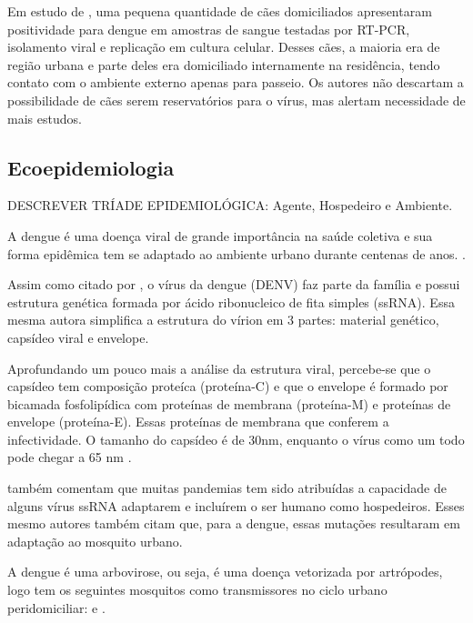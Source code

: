 \indent Em estudo de , uma pequena quantidade de cães domiciliados apresentaram positividade para dengue em amostras de sangue testadas por RT-PCR, isolamento viral e replicação em cultura celular. Desses cães, a maioria era de região urbana e parte deles era domiciliado internamente na residência, tendo contato com o ambiente externo apenas para passeio. Os autores não descartam a possibilidade de cães serem reservatórios para o vírus, mas alertam necessidade de mais estudos.

\subsection{Ecoepidemiologia}

\indent DESCREVER TRÍADE EPIDEMIOLÓGICA: Agente, Hospedeiro e Ambiente.


\indent A dengue é uma doença viral de grande importância na saúde coletiva e sua forma epidêmica tem se adaptado ao ambiente urbano durante centenas de anos. \cite{ArboviralTransmission}.

\indent Assim como citado por , o vírus da dengue (\acrfull{DENV}) faz parte da família  e possui estrutura genética formada por ácido ribonucleico de fita simples (\acrfull{ssRNA}). Essa mesma autora simplifica a estrutura do vírion em 3 partes: material genético, capsídeo viral e envelope.

\indent Aprofundando um pouco mais a análise da estrutura viral, percebe-se que o capsídeo tem composição proteíca (proteína-C) e que o envelope é formado por bicamada fosfolipídica com proteínas de membrana (proteína-M) e proteínas de envelope (proteína-E). Essas proteínas de membrana que conferem a infectividade. O tamanho do capsídeo é de 30nm, enquanto o vírus como um todo pode chegar a 65 nm \cite{Fiocruz2010Atlas}. 

 também comentam que muitas pandemias tem sido atribuídas a capacidade de alguns vírus \acrshort{ssRNA} adaptarem e incluírem o ser humano como hospedeiros. Esses mesmo autores também citam que, para a dengue, essas mutações resultaram em adaptação ao mosquito urbano.

\indent A dengue é uma arbovirose, ou seja, é uma doença vetorizada por artrópodes, logo tem os seguintes mosquitos como transmissores no ciclo urbano peridomiciliar:  e  \cite{ArboviralTransmission}.

